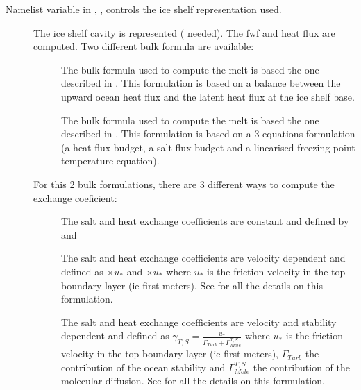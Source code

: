 \documentclass[../tex_main/NEMO_manual]{subfiles}
\begin{document}
Namelist variable in , , controls the ice shelf representation used. 
\begin{description}
\item[]
The ice shelf cavity is represented ( needed). The fwf and heat flux are computed. 
Two different bulk formula are available:
	\begin{description}
	\item[]
	The bulk formula used to compute the melt is based the one described in \citet{Hunter2006}.
        This formulation is based on a balance between the upward ocean heat flux and the latent heat flux at the ice shelf base.

	\item[] 
	The bulk formula used to compute the melt is based the one described in \citet{Jenkins1991}.
        This formulation is based on a 3 equations formulation (a heat flux budget, a salt flux budget
         and a linearised freezing point temperature equation).
	\end{description}

For this 2 bulk formulations, there are 3 different ways to compute the exchange coeficient:
	\begin{description}
        \item[]
	The salt and heat exchange coefficients are constant and defined by  and 

	\item[]
	The salt and heat exchange coefficients are velocity dependent and defined as $ \times u_{*}$ and $ \times u_{*}$
        where $u_{*}$ is the friction velocity in the top boundary layer (ie first  meters).
        See \citet{Jenkins2010} for all the details on this formulation.
	
	\item[]
	The salt and heat exchange coefficients are velocity and stability dependent and defined as 
        $\gamma_{T,S} = \frac{u_{*}}{\Gamma_{Turb} + \Gamma^{T,S}_{Mole}}$
        where $u_{*}$ is the friction velocity in the top boundary layer (ie first  meters), 
        $\Gamma_{Turb}$ the contribution of the ocean stability and 
        $\Gamma^{T,S}_{Mole}$ the contribution of the molecular diffusion.
        See \citet{Holland1999} for all the details on this formulation.
        \end{description}


\end{description}
\end{document}
